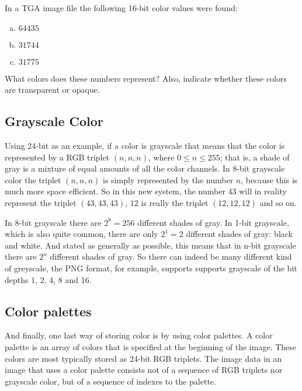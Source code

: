 \begin{Exercise}[label={tga-16-bit}]

  In a TGA image file the following 16-bit color values were found:

  \begin{enumerate}[(a)]
  \item $64435$
  \item $31744$
  \item $31775$
  \end{enumerate}

  What colors does these numbers represent? Also, indicate whether
  these colors are transparent or opaque.

\end{Exercise}

\subsection{Grayscale Color}

\newcommand{\selfrgbtrip}[3]{\mbox{\textcolor[RGB]{#1,#2,#3}{(#1,#2,#3)}}}
\newcommand{\selfrgbtripgray}[1]{\selfrgbtrip{#1}{#1}{#1}}

Using 24-bit as an example, if a color is grayscale that means that
the color is represented by a RGB triplet $(n,n,n)$, where $0 \le n
\le 255$; that is, a shade of gray is a mixture of equal amounts of
all the color channels. In 8-bit grayscale color the triplet $(n,n,n)$
is simply represented by the number $n$, because this is much more
space efficient. So in this new system, the number $43$ will in
reality represent the triplet $(43,43,43)$, $12$ is really the triplet
$(12,12,12)$ and so on.

In 8-bit grayscale there are $2^8 = 256$ different shades of gray. In
1-bit grayscale, which is also quite common, there are only $2^1 = 2$
different shades of gray: black and white. And stated as generally as
possible, this means that in n-bit grayscale there are $2^n$ different
shades of gray. So there can indeed be many different kind of
greyscale, the PNG format, for example, supports supports grayscale of
the bit depths $1$, 2, 4, 8 and
16\cite{boutel:_png_portab_networ_graph_specif_version12}.

\subsection{Color palettes}

And finally, one last way of storing color is by using color
palettes. A color palette is an array of colors that is specified at
the beginning of the image. These colors are most typically stored as
24-bit RGB triplets. The image data in an image that uses a color
palette consists not of a sequence of RGB triplets nor grayscale
color, but of a sequence of indexes to the palette.

